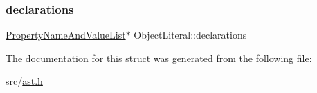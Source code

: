 \subsubsection{\texorpdfstring{declarations}{declarations}}
{\footnotesize\ttfamily \hyperlink{struct_property_name_and_value_list}{Property\+Name\+And\+Value\+List}$\ast$ Object\+Literal\+::declarations}



The documentation for this struct was generated from the following file\+:\begin{DoxyCompactItemize}
\item 
src/\hyperlink{ast_8h}{ast.\+h}\end{DoxyCompactItemize}
